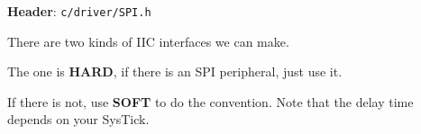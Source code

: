 \textbf{Header}: \verb|c/driver/SPI.h|

There are two kinds of IIC interfaces we can make.

The one is \textbf{HARD}, if there is an SPI peripheral, just use it.

If there is not, use \textbf{SOFT} to do the convention. Note that the delay time depends on your SysTick.

